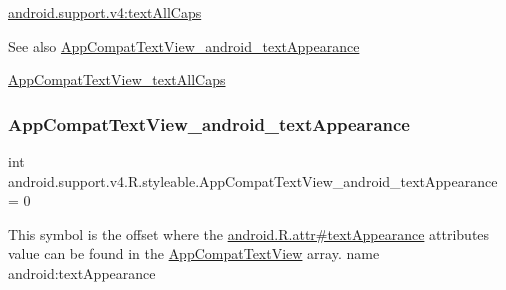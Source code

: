 {\ttfamily \hyperlink{classandroid_1_1support_1_1v4_1_1R_1_1styleable_ad554631420683f73672ace7476a916d7}{android.\+support.\+v4\+:text\+All\+Caps}}

\begin{DoxySeeAlso}{See also}
\hyperlink{classandroid_1_1support_1_1v4_1_1R_1_1styleable_ad4e24f35a933d296cd14f60c381e75b8}{App\+Compat\+Text\+View\+\_\+android\+\_\+text\+Appearance} 

\hyperlink{classandroid_1_1support_1_1v4_1_1R_1_1styleable_ad554631420683f73672ace7476a916d7}{App\+Compat\+Text\+View\+\_\+text\+All\+Caps} 
\end{DoxySeeAlso}
\mbox{\label{classandroid_1_1support_1_1v4_1_1R_1_1styleable_ad4e24f35a933d296cd14f60c381e75b8}} 
\subsubsection{\texorpdfstring{App\+Compat\+Text\+View\+\_\+android\+\_\+text\+Appearance}{AppCompatTextView\_android\_textAppearance}}
{\footnotesize\ttfamily int android.\+support.\+v4.\+R.\+styleable.\+App\+Compat\+Text\+View\+\_\+android\+\_\+text\+Appearance = 0\hspace{0.3cm}{\ttfamily [static]}}

This symbol is the offset where the \hyperlink{}{android.\+R.\+attr\#text\+Appearance} attribute\textquotesingle{}s value can be found in the \hyperlink{classandroid_1_1support_1_1v4_1_1R_1_1styleable_a88f80fd07175f06b735411ca091754c2}{App\+Compat\+Text\+View} array.  name android\+:text\+Appearance \mbox{\label{classandroid_1_1support_1_1v4_1_1R_1_1styleable_ad554631420683f73672ace7476a916d7}} 
